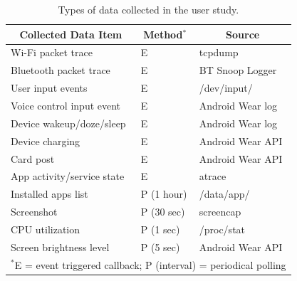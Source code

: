 \begin{table}[t]
	\centering
	\footnotesize
	\begin{tabular}{l|l|l}
		\multicolumn{1}{c|}{Collected Data Item}   & \multicolumn{1}{|c}{Method$^*$} & \multicolumn{1}{|c}{Source} \\
		\hline
		Wi-Fi packet trace                       & E    & tcpdump \\ %
		Bluetooth packet trace                   & E    & BT Snoop Logger\\ %
		User input events                        & E    & /dev/input/ \\
		Voice control input event                & E    & Android Wear log \\ %
		Device wakeup/doze/sleep                      & E    & Android Wear log \\
		Device charging                          & E    & Android Wear API \\ %
		Card post                                & E    & Android Wear API \\
		App activity/service state               & E    & atrace \\  %
		Installed apps list                      & P (1 hour) & /data/app/ \\ %
		Screenshot                               & P (30 sec) & screencap \\ %
		CPU utilization                          & P (1 sec)  & /proc/stat \\ %
		Screen brightness level                  & P (5 sec)  & Android Wear API \\ %
		\hline
		\multicolumn{3}{l}{$^*$E = event triggered callback; P (interval) = periodical polling}
	\end{tabular}
	\vspace{-.1in}
	\caption{\footnotesize Types of data collected in the user study.}
	\vspace{-.1in}
	\label{tab:data}
\end{table}


